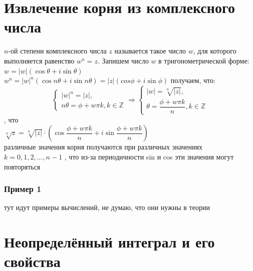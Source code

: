 \documentclass[oneside]{book}
\begin{document}
\begin{enumerate}
\begin{itemize}
\begin{enumerate}
\chapter{Извлечение корня из комплексного числа}
 $n$-ой степени комплексного числа $z$ называется такое число $w$, для которого выполняется равенство $w^n=z$. Запишем число $w$ в тригонометрической форме: $w=|w|(\cos\theta+i\sin\theta)$\\
$w^n=|w|^n(\cos n\theta+i\sin n\theta)=|z|(cos\phi+i\sin\phi)$
 получаем, что:
\begin{equation}
	\begin{cases}
		|w|^n=|z|,\\
		n\theta=\phi+w\pi k, k \in \mathbb{Z}
	\end{cases}
	\Rightarrow
	\begin{cases}
		|w|=\sqrt[n]{|z|},\\
		\theta=\dfrac{\phi+w\pi k}{n}, k \in \mathbb{Z}
	\end{cases}
\end{equation}
, что\\
$\sqrt[n]{z}=\sqrt[n]{|z|}\cdot (\cos\dfrac{\phi+w\pi k}{n}+i\sin\dfrac{\phi+w\pi k}{n})$\\
различные значения корня получаются при различных значениях $k=0, 1, 2, ..., n-1$
, что из-за периодичности sin и cos эти значения могут повторяться
\subsection{Пример 1}
тут идут примеры вычислений, не думаю, что они нужны в теории

\setcounter{chapter}{31}
\chapter[Неопределённый интеграл]{Неопределённый интеграл и его свойства}

\end{enumerate}
\end{itemize}
\end{enumerate}
\end{document}
